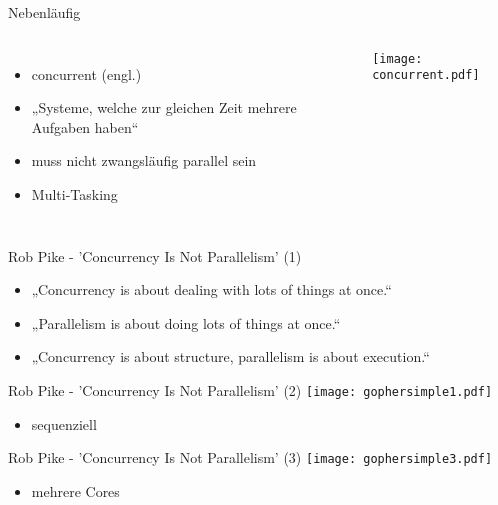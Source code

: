 \documentclass[compress]{beamer}
\begin{document}
  \begin{frame}{Nebenläufig}
    \begin{columns}[c]
      \begin{itemize}
        \item concurrent (engl.)
        \item „Systeme, welche zur gleichen Zeit mehrere \alert{Aufgaben} haben“
        \item muss nicht zwangsläufig parallel sein
        \item Multi-Tasking
      \end{itemize}
      \texttt{[image: concurrent.pdf]}
    \end{columns}
  \end{frame}
  
  \note[itemize]{
  }

  \begin{frame}{Rob Pike - 'Concurrency Is Not Parallelism' (1)}
    \begin{itemize}
      \item „Concurrency is about dealing with lots of things at once.“
      \item „Parallelism is about doing lots of things at once.“
      \item „Concurrency is about structure, parallelism is about execution.“
    \end{itemize}
  \end{frame}


  \begin{frame}{Rob Pike - 'Concurrency Is Not Parallelism' (2)}
    \texttt{[image: gophersimple1.pdf]}
    \begin{itemize}
      \item sequenziell
    \end{itemize}
  \end{frame}

  \begin{frame}{Rob Pike - 'Concurrency Is Not Parallelism' (3)}
    \texttt{[image: gophersimple3.pdf]}
    \begin{itemize}
      \item mehrere Cores
    \end{itemize}
  \end{frame}
\end{document}
